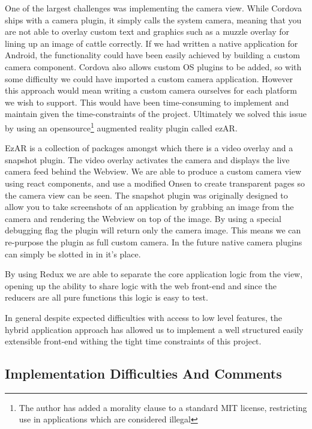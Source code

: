 One of the largest challenges was implementing the camera view. While Cordova ships with a camera plugin, it simply calls the system camera, meaning that you are not able to overlay custom text and graphics such as a muzzle overlay for lining up an image of cattle correctly. If we had written a native application for Android, the functionality could have been easily achieved by building a custom camera component. Cordova also allows custom OS plugins to be added, so with some difficulty we could have imported a custom camera application. However this approach would mean writing a custom camera ourselves for each platform we wish to support. This would have been time-consuming to implement and maintain given the time-constraints of the project. Ultimately we solved this issue by using an opensource\footnote{The author has added a morality clause to a standard MIT license, restricting use in applications which are considered illegal}  augmented reality plugin called ezAR. 

EzAR is a collection of packages amongst which there is a video overlay and a snapshot plugin. The video overlay activates the camera and displays the live camera feed behind the Webview. We are able to produce a custom camera view using react components, and use a modified Onsen to create transparent pages so the camera view can be seen. The snapshot plugin was originally designed to allow you to take screenshots of an application by grabbing an image from the camera and rendering the Webview on top of the image. By using a special debugging flag the plugin will return only the camera image. This means we can re-purpose the plugin as full custom camera. In the future native camera plugins can simply be slotted in in it's place.

By using Redux we are able to separate the core application logic from the view, opening up the ability to share logic with the web front-end and since the reducers are all pure functions this logic is easy to test.


In general despite expected difficulties with access to low level features, the hybrid application approach has allowed us to implement a well structured easily extensible front-end withing the tight time constraints of this project.


\subsection{Implementation Difficulties And Comments}


